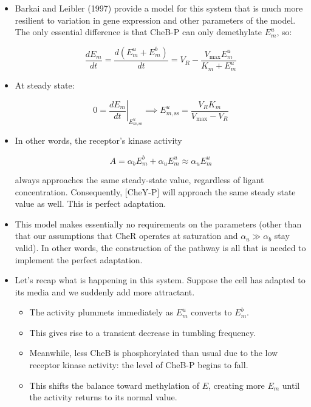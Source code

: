 \documentclass{article}
\begin{document}
\begin{itemize} 
 
\item Barkai and Leibler (1997) provide a model for this system that is much more resilient to variation in gene expression and other parameters of the model. The only essential difference is that CheB-P can only demethylate $E_m^u$, so:

\[ \frac{dE_m}{dt} = \frac{d \left(E_m^u + E_m^b \right)}{dt} = V_R - \frac{ V_{\textrm{max}} E_m^u}{K_m + E_m^u}  \]

\item At steady state:

\[ 0 = \left. \frac{dE_m}{dt} \right|_{E_{m,\textrm{ss}}^u} \implies E_{m,\textrm{ss}}^u = \frac{V_R K_m}{V_{\textrm{max}} - V_R} \]

\item In other words, the receptor's kinase activity

\[ A =  \alpha_b E_m^b + \alpha_u E_m^u \approx \alpha_u E_m^u \]

always approaches the same steady-state value, regardless of ligant concentration. Consequently, [CheY-P] will approach the same steady state value as well. This is perfect adaptation.

\item This model makes essentially no requirements on the parameters (other than that our assumptions that CheR operates at saturation and $\alpha_u \gg \alpha_b$ stay valid). In other words, the construction of the pathway is all that is needed to implement the perfect adaptation.

\item Let's recap what is happening in this system. Suppose the cell has adapted to its media and we suddenly add more attractant.
\begin{itemize}
\item  The activity plummets immediately as $E_m^u$ converts to $E_m^b$.
\item This gives rise to a transient decrease in tumbling frequency.
\item Meanwhile, less CheB is phosphorylated than usual due to the low receptor kinase activity: the level of CheB-P begins to fall.
\item This shifts the balance toward methylation of $E$, creating more $E_m$ until the activity returns to its normal value.
\end{itemize}

\end{itemize}
\end{document}
